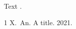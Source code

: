 \documentclass{article}
\begin{document}
Text \cite{a}.
\begin{thebibliography}{1}
 X.~An. A title. 2021.
\end{thebibliography}
\end{document}
